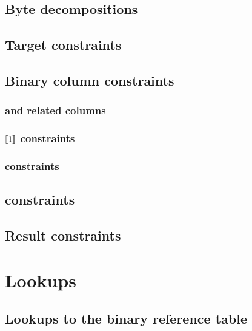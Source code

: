 \subsection{Byte decompositions}                                                        \label{bin: byte decompositions and bytehood}             
\subsection{Target constraints}                                                         \label{bin: target constraints}                           
\subsection{Binary column constraints}
\subsubsection{\BITS{} and related columns}                                             \label{bin: bits and related columns constraints}         
\subsubsection{$[\![1]\!]$ constraints}                                                   \label{bin: bit_1}                                        
\subsubsection{\smallness{} constraints}                                                \label{bin: smallness}                                    
\subsection{\pivotByte{} constraints}                                                   \label{bin: pibot byte}                                   
\subsection{Result constraints}                                                         \label{bin: result constraints}                           

\section{Lookups}
\subsection{Lookups to the binary reference table}                                      \label{bin: lookup}                                       
